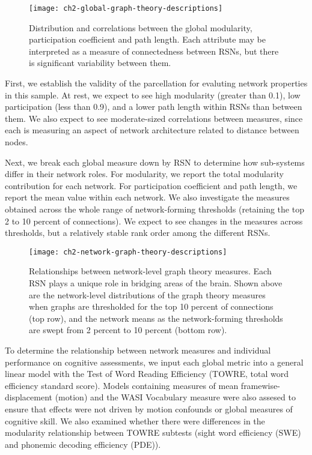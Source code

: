 \begin{figure}[t]
    \centering
    \texttt{[image: ch2-global-graph-theory-descriptions]}
    \caption[Distribution and correlations between global graph theory measures.]{Distribution and correlations between the global modularity, participation coefficient and path length. Each attribute may be interpreted as a measure of connectedness between RSNs, but there is significant variability between them.}
    \label{fig:ch2-global-graph-theory-descriptions}
\end{figure}

First, we establish the validity of the parcellation for evaluting network properties in this sample. At rest, we expect to see high modularity (greater than 0.1), low participation (less than 0.9), and a lower path length within RSNs than between them. We also expect to see moderate-sized correlations between measures, since each is measuring an aspect of network architecture related to distance between nodes.  

Next, we break each global measure down by RSN to determine how sub-systems differ in their network roles. For modularity, we report the total modularity contribution for each network. For participation coefficient and path length, we report the mean value within each network. We also investigate the measures obtained across the whole range of network-forming thresholds (retaining the top 2 to 10 percent of connections). We expect to see changes in the measures across thresholds, but a relatively stable rank order among the different RSNs. 

\begin{figure}[t]
    \centering
    \texttt{[image: ch2-network-graph-theory-descriptions]}
    \caption[Relationships between network-level graph theory measures.]{Relationships between network-level graph theory measures. Each RSN plays a unique role in bridging areas of the brain. Shown above are the network-level distributions of the graph theory measures when graphs are thresholded for the top 10 percent of connections (top row), and the network means as the network-forming thresholds are swept from 2 percent to 10 percent (bottom row).}
    \label{fig:ch2-network-graph-theory-descriptions}
\end{figure}

To determine the relationship between network measures and individual performance on cognitive assessments, we input each global metric into a general linear model with the Test of Word Reading Efficiency (TOWRE, total word efficiency standard score). Models containing measures of mean framewise-displacement (motion) and the WASI Vocabulary measure were also assesed to ensure that effects were not driven by motion confounds or global measures of cognitive skill. We also examined whether there were differences in the modularity relationship between TOWRE subtests (sight word efficiency (SWE) and phonemic decoding efficiency (PDE)).

